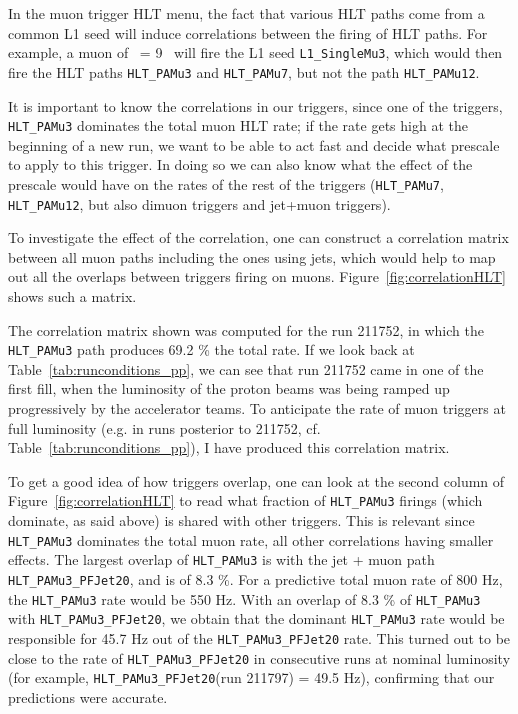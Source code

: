 In the muon trigger HLT menu, the fact that various HLT paths come
from a common L1 seed will induce correlations between the firing of
HLT paths. For example, a muon of \pt\ = 9 \GeVc\ will fire the L1
seed \verb?L1_SingleMu3?, which would then fire the HLT paths
\verb?HLT_PAMu3? and \verb?HLT_PAMu7?, but not the path
\verb?HLT_PAMu12?.



It is important to know the correlations in our triggers, since one of
the triggers, \verb?HLT_PAMu3? dominates the total muon HLT rate; if
the rate gets high at the beginning of a new run, we want to be able
to act fast and decide what prescale to apply to this trigger. In
doing so we can also know what the effect of the prescale would have
on the rates of the rest of the triggers (\verb?HLT_PAMu7?,
\verb?HLT_PAMu12?, but also dimuon triggers and jet+muon triggers).


To investigate the effect of the correlation, one can construct a
correlation matrix between all muon paths including the ones using
jets, which would help to map out all the overlaps between triggers
firing on muons. Figure~\ref{fig:correlationHLT} shows such a matrix.

The correlation matrix shown was computed for the run 211752, in which
the \verb?HLT_PAMu3? path produces 69.2 \% the total rate. If we look
back at Table~\ref{tab:runconditions_pp}, we can see that run 211752
came in one of the first fill, when the luminosity of the proton beams
was being ramped up progressively by the accelerator teams. To
anticipate the rate of muon triggers at full luminosity (e.g. in runs
posterior to 211752, cf. Table~\ref{tab:runconditions_pp}), I
have produced this correlation matrix. 





To get a good idea of how triggers overlap, one can look at the second
column of Figure~\ref{fig:correlationHLT} to read what fraction of
\verb?HLT_PAMu3? firings (which dominate, as said above) is shared
with other triggers. This is relevant since \verb?HLT_PAMu3? dominates
the total muon rate, all other correlations having smaller
effects. The largest overlap of \verb?HLT_PAMu3? is with the jet + muon path 
\verb?HLT_PAMu3_PFJet20?, and is of 8.3 \%. For a predictive total
muon rate of 800 Hz, the \verb?HLT_PAMu3? rate would be 550 Hz. With an
overlap of 8.3 \% of \verb?HLT_PAMu3? with \verb?HLT_PAMu3_PFJet20?, we obtain
that the dominant \verb?HLT_PAMu3? rate would be responsible for 45.7
Hz out of the \verb?HLT_PAMu3_PFJet20? rate. This turned out to be
close to the rate of \verb?HLT_PAMu3_PFJet20? in
consecutive runs at nominal luminosity (for example,
\verb?HLT_PAMu3_PFJet20?(run 211797) = 49.5 Hz), confirming that our
predictions were accurate.


